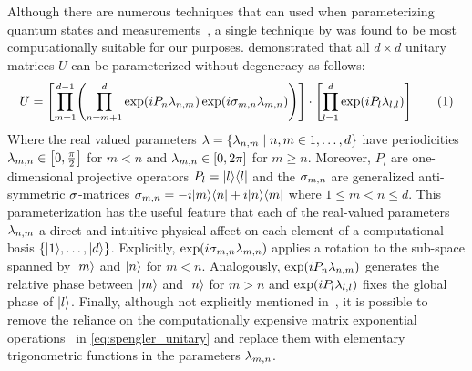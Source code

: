 \documentclass[aps, 10pt, english, twoside, pra, nofootinbib, tightenlines, longbibliography, superscriptaddress]{revtex4-1}
\begin{document}
    Although there are numerous techniques that can used when parameterizing quantum states and measurements~\cite{Petz_2015, Hedemann_2013,Fujii_2005,James_2001,Grasmair_2014,Neilsen_Chaung_2011}, a single technique by \citet{Spengler_2010_Unitary} was found to be most computationally suitable for our purposes.  demonstrated that all $d\times d$ unitary matrices $U$ can be parameterized without degeneracy as follows:
    \[ U = \bs{\prod_{m=1}^{d-1} \br{\prod_{n=m+1}^{d} \exp\br{i P_n \lambda_{n,m}}\exp\br{i \si_{m,n} \lambda_{m,n}}}} \cdot \bs{\prod_{l=1}^{d} \exp\br{iP_l \lambda_{l,l}}}  \eq \label{eq:spengler_unitary} \]
    Where the real valued parameters $\la = \bc{\la_{n,m} \mid n,m \in 1, \ldots, d}$ have periodicities $\la_{m,n} \in \bs{0, \f{\pi}{2}}$ for $m < n$ and $\la_{m,n} \in \bs{0, 2 \pi}$ for $m \geq n$. Moreover, $P_l$ are one-dimensional projective operators $P_l = \ket{l}\bra{l}$ and the $\sigma_{m,n}$ are generalized anti-symmetric $\sigma$-matrices $\sigma_{m,n} = -i \ket{m}\bra{n} +i \ket{n}\bra{m}$ where $1 \leq m < n \leq d$. This parameterization has the useful feature that each of the real-valued parameters $\lambda_{n,m}$ a direct and intuitive physical affect on each element of a computational basis $\bc{\ket{1}, \ldots, \ket{d}}$. Explicitly, $\exp\br{i \si_{m,n} \lambda_{m,n}}$ applies a rotation to the sub-space spanned by $\ket{m}$ and $\ket{n}$ for $m < n$. Analogously, $\exp\br{i P_n \lambda_{n,m}}$ generates the relative phase between $\ket{m}$ and $\ket{n}$ for $m > n$ and $\exp\br{iP_l \lambda_{l,l}}$ fixes the global phase of $\ket{l}$. Finally, although not explicitly mentioned in~\cite{Spengler_2010_Unitary}, it is possible to remove the reliance on the computationally expensive matrix exponential operations~\cite{Moler_2003} in \cref{eq:spengler_unitary} and replace them with elementary trigonometric functions in the parameters $\lambda_{m,n}$.
\end{document}
